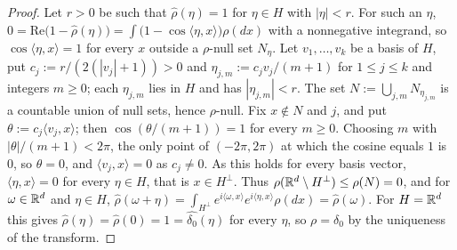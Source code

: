 \begin{proof}
\leanok
Let $r > 0$ be such that $\widehat\rho(\eta) = 1$ for $\eta \in H$ with $|\eta| < r$. For such an
$\eta$, $0 = \mathrm{Re}\bigl(1 - \widehat\rho(\eta)\bigr)
= \int\bigl(1 - \cos\langle\eta,x\rangle\bigr)\rho(dx)$ with a nonnegative integrand, so
$\cos\langle\eta,x\rangle = 1$ for every $x$ outside a $\rho$-null set $N_\eta$. Let
$v_1, \dots, v_k$ be a basis of $H$, put $c_j := r/(2(|v_j| + 1)) > 0$ and
$\eta_{j,m} := c_jv_j/(m+1)$ for $1 \le j \le k$ and integers $m \ge 0$; each $\eta_{j,m}$ lies
in $H$ and has $|\eta_{j,m}| < r$. The set $N := \bigcup_{j,m}N_{\eta_{j,m}}$ is a countable
union of null sets, hence $\rho$-null. Fix $x \notin N$ and $j$, and put
$\theta := c_j\langle v_j,x\rangle$; then $\cos(\theta/(m+1)) = 1$ for every $m \ge 0$. Choosing
$m$ with $|\theta|/(m+1) < 2\pi$, the only point of $(-2\pi, 2\pi)$ at which the cosine equals
$1$ is $0$, so $\theta = 0$, and $\langle v_j,x\rangle = 0$ as $c_j \ne 0$. As this holds for
every basis vector, $\langle\eta,x\rangle = 0$ for every $\eta \in H$, that is $x \in H^\perp$.
Thus $\rho(\mathbb{R}^d \setminus H^\perp) \le \rho(N) = 0$, and for $\omega \in \mathbb{R}^d$ and $\eta \in H$,
$\widehat\rho(\omega+\eta) = \int_{H^\perp}e^{i\langle\omega,x\rangle}e^{i\langle\eta,x\rangle}\rho(dx)
= \widehat\rho(\omega)$. For $H = \mathbb{R}^d$ this gives $\widehat\rho(\eta) = \widehat\rho(0) = 1 =
\widehat{\delta_0}(\eta)$ for every $\eta$, so $\rho = \delta_0$ by the uniqueness of the
transform.
\end{proof}

